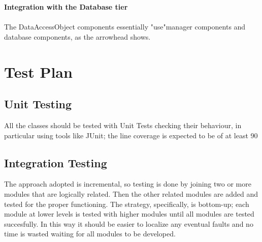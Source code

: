\documentclass[../DD.tex]{subfiles}
\begin{document}

\textbf{Integration with the Database tier} \\
\\ The DataAccessObject components essentially "use"manager components and database components, as the arrowhead shows. \\


\section{Test Plan\label{5.4}}

\subsection{Unit Testing\label{5.4.1}}
All the classes should be tested with Unit Tests checking their behaviour, in particular using tools like JUnit; the line coverage is expected to be of at least 90%


\subsection{Integration Testing\label{5.4.2}}

The approach adopted is incremental, so testing is done by joining two or more modules that are logically related. Then the other related modules are added and tested for the proper functioning. The strategy, specifically, is bottom-up; each module at lower levels is tested with higher modules until all modules are tested succesfully. In this way it should be easier to localize any eventual faults and no time is wasted waiting for all modules to be developed.
\end{document}
